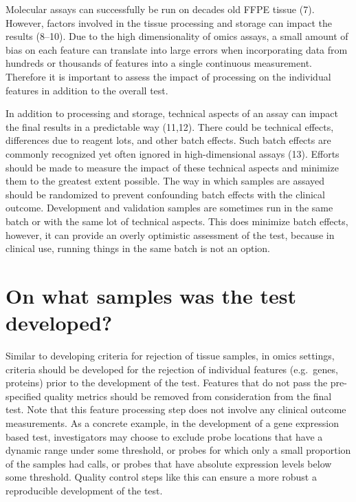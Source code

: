\documentclass[11pt]{article}
\begin{document}
Molecular assays can successfully be run on decades old FFPE tissue (7).
However, factors involved in the tissue processing and storage can
impact the results (8--10). Due to the high dimensionality of omics
assays, a small amount of bias on each feature can translate into large
errors when incorporating data from hundreds or thousands of features
into a single continuous measurement. Therefore it is important to
assess the impact of processing on the individual features in addition
to the overall test.

In addition to processing and storage, technical aspects of an assay can
impact the final results in a predictable way (11,12). There could be
technical effects, differences due to reagent lots, and other batch
effects. Such batch effects are commonly recognized yet often ignored in
high-dimensional assays (13). Efforts should be made to measure the
impact of these technical aspects and minimize them to the greatest
extent possible. The way in which samples are assayed should be
randomized to prevent confounding batch effects with the clinical
outcome. Development and validation samples are sometimes run in the
same batch or with the same lot of technical aspects. This does minimize
batch effects, however, it can provide an overly optimistic assessment
of the test, because in clinical use, running things in the same batch
is not an option.

\section{On what samples was the test
developed?}\label{on-what-samples-was-the-test-developed}

Similar to developing criteria for rejection of tissue samples, in omics
settings, criteria should be developed for the rejection of individual
features (e.g.~genes, proteins) prior to the development of the test.
Features that do not pass the pre-specified quality metrics should be
removed from consideration from the final test. Note that this feature
processing step does not involve any clinical outcome measurements. As a
concrete example, in the development of a gene expression based test,
investigators may choose to exclude probe locations that have a dynamic
range under some threshold, or probes for which only a small proportion
of the samples had calls, or probes that have absolute expression levels
below some threshold. Quality control steps like this can ensure a more
robust a reproducible development of the test.
\end{document}
